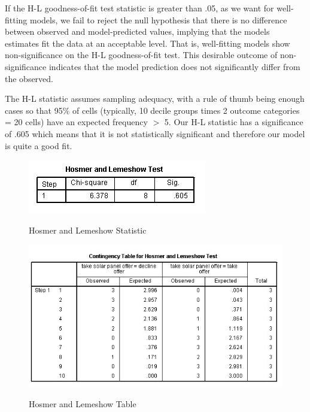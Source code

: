 \documentclass[a4paper,12pt]{article}
\begin{document}
If the H-L goodness-of-fit test statistic is greater than .05, as we want for well-fitting models, we fail to reject the null hypothesis that there is no difference between observed and model-predicted values, implying that the models estimates fit the data at an acceptable level. That is, well-fitting models show non-significance on the
H-L goodness-of-fit test. This desirable outcome of non-significance indicates that the
model prediction does not significantly differ from the observed.

The H-L statistic assumes sampling adequacy, with a rule of thumb being enough cases so that 95\% of cells (typically, 10 decile groups times 2 outcome categories = 20 cells) have an expected frequency $>$ 5. Our H-L statistic has a significance of .605 which means that it is not statistically significant and therefore our model is quite a
good fit.
\begin{figure}[h!]
\begin{center}
  \includegraphics[scale=0.6]{images/Logistic7A}\\
  \caption{Hosmer and Lemeshow Statistic}
\end{center}
\end{figure}

\begin{figure}[h!]
\begin{center}
  \includegraphics[scale=0.6]{images/Logistic6}\\
  \caption{Hosmer and Lemeshow Table}
\end{center}
\end{figure}
\newpage
\end{document}
